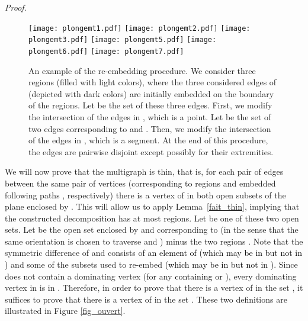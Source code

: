 \documentclass[a4paper,11pt]{article}
\newcommand{\rlem}   [1] {Lemma~\ref{#1}\xspace}
\newenvironment{proof}{\noindent \textit{Proof. }}{\hfill\vspace{.2cm}}
\newcommand{\addOK}   [1] {\textcolor{black} {#1}}
\newcommand{\modifOK} [2] {\addOK{#2}}
\newcommand{\ig}[1]{\textcolor{blue}{\fbox{\fbox{\textcolor{blue}{#1}}}}}
\begin{document}
\begin{proof}
\begin{figure}[h]
\begin{center}
   \texttt{[image: plongemt1.pdf]}
   \texttt{[image: plongemt2.pdf]}
   \texttt{[image: plongemt3.pdf]}
\texttt{[image: plongemt5.pdf]}
   \texttt{[image: plongemt6.pdf]}
   \texttt{[image: plongemt7.pdf]}

\end{center}
   \caption{An example of the re-embedding procedure. We consider three regions  (filled with light colors), where the three considered edges of  (depicted with dark colors) are initially embedded on the boundary of the regions. Let  be the set of these three edges. First, we modify the intersection  of the edges in , which is a point. Let  be the set of two edges corresponding to  and . Then, we modify the intersection of the edges in , which is a segment. At the end of this procedure, the edges are pairwise disjoint except possibly for their extremities.}
   \label{fig_replonge}
\end{figure}

We will now prove that the multigraph  is thin, that is, for each pair of edges  between the same pair of vertices  (corresponding to regions  and embedded following  paths , respectively) there is a vertex of  in both open subsets of the plane enclosed by . This will allow us to apply \rlem{fait_thin}, implying that the constructed decomposition has at most  regions. Let  be one of these two open sets.
Let  be the open set enclosed by  and corresponding to  (in the sense that the same orientation is chosen to traverse  and ) minus the two regions .
Note that the symmetric difference of  and  consists of \modifOK{some of the two regions \ig{tu veux dire toute une r\'egion, ou juste une partie d'une des r\'egions?}}{an element of  (which may be in  but not in )}  and some of the subsets  used to re-embed  \modifOK{}{(which may be in  but not in )}. Since  does not contain a dominating vertex (for any \modifOK{}{ containing  or }), every dominating vertex in  is in \modifOK{ \ig{on n'a pas d\'efinit }}{}. \modifOK{And since  is a subset of , every dominating vertex in  is in .}{}Therefore, in order to prove that there is a vertex of  in the set , it suffices to prove that there is a vertex of  in the set .
These two definitions are illustrated in Figure \ref{fig_ouvert}.


\end{proof}
\end{document}
